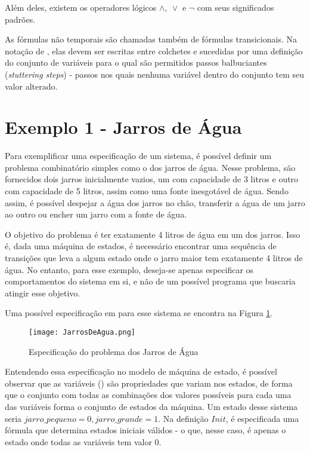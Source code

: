  Além deles, existem os operadores lógicos $\land,\ \lor$ e $\neg$ com seus significados padrões.

As fórmulas não temporais são chamadas também de fórmulas transicionais. Na notação de \TLA, elas devem ser escritas entre colchetes e sucedidas por uma definição do conjunto de variáveis para o qual são permitidos passos balbuciantes (\textit{stuttering steps}) - passos nos quais nenhuma variável dentro do conjunto tem seu valor alterado.


\section{Exemplo 1 - Jarros de Água}
\label{exemplo1}

Para exemplificar uma especificação de um sistema, é possível definir um problema combinatório simples como o dos jarros de água. Nesse problema, são fornecidos dois jarros inicialmente vazios, um com capacidade de 3 litros e outro com capacidade de 5 litros, assim como uma fonte inesgotável de água. Sendo assim, é possível despejar a água dos jarros no chão, transferir a água de um jarro ao outro ou encher um jarro com a fonte de água.

O objetivo do problema é ter exatamente 4 litros de água em um dos jarros. Isso é, dada uma máquina de estados, é necessário encontrar uma sequência de transições que leva a algum estado onde o jarro maior tem exatamente 4 litros de água. No entanto, para esse exemplo, deseja-se apenas especificar os comportamentos do sistema em si, e não de um possível programa que buscaria atingir esse objetivo.

Uma possível especificação em \TLA para esse sistema se encontra na Figura \ref{fig:ex1tla}.

\begin{figure}
  \centering
  \texttt{[image: JarrosDeAgua.png]}
  \caption{Especificação do problema dos Jarros de Água}
  \label{fig:ex1tla}
\end{figure}

Entendendo essa especificação no modelo de máquina de estado, é possível observar que as variáveis (\VARIABLES) são propriedades que variam nos estados, de forma que o conjunto com todas as combinações dos valores possíveis para cada uma das variáveis forma o conjunto de estados da máquina. Um estado desse sistema seria $jarro\_pequeno = 0, jarro\_grande = 1$. Na definição $Init$, é especificada uma fórmula que determina estados iniciais válidos - o que, nesse caso, é apenas o estado onde todas as variáveis tem valor 0.

